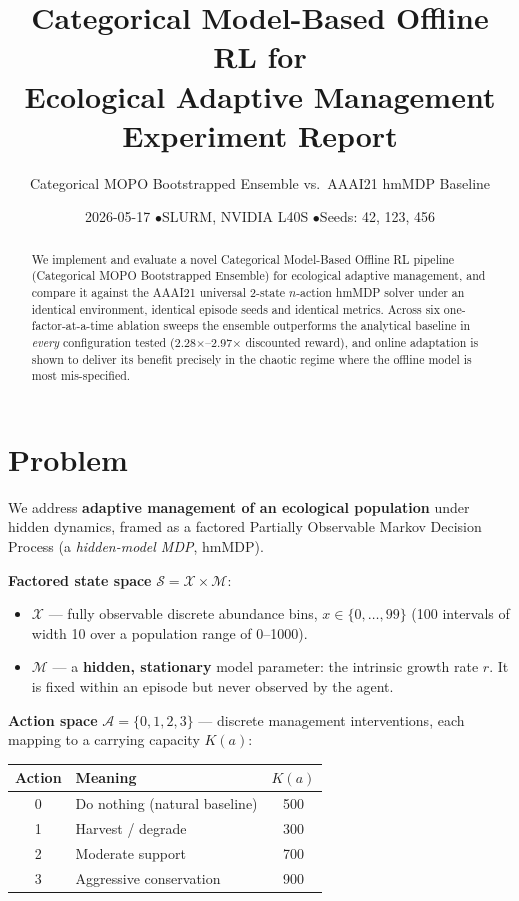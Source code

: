 \documentclass[11pt]{article}
\title{\textbf{Categorical Model-Based Offline RL for\\ Ecological Adaptive Management}\\[0.4em]
\large Experiment Report}
\author{Categorical MOPO Bootstrapped Ensemble vs.\ AAAI21 hmMDP Baseline}
\date{2026-05-17 \quad$\bullet$\quad SLURM, NVIDIA L40S \quad$\bullet$\quad Seeds: 42, 123, 456}
\begin{document}
\maketitle
\thispagestyle{empty}

\begin{abstract}
\noindent We implement and evaluate a novel Categorical Model-Based Offline RL
pipeline (Categorical MOPO Bootstrapped Ensemble) for ecological adaptive
management, and compare it against the AAAI21 universal 2-state $n$-action
hmMDP solver under an identical environment, identical episode seeds and
identical metrics. Across six one-factor-at-a-time ablation sweeps the
ensemble outperforms the analytical baseline in \emph{every} configuration
tested (2.28$\times$--2.97$\times$ discounted reward), and online adaptation
is shown to deliver its benefit precisely in the chaotic regime where the
offline model is most mis-specified.
\end{abstract}

\tableofcontents
\newpage

\section{Problem}

We address \textbf{adaptive management of an ecological population} under
hidden dynamics, framed as a factored Partially Observable Markov Decision
Process (a \emph{hidden-model MDP}, hmMDP).

\textbf{Factored state space} $\mathcal{S} = \mathcal{X} \times \mathcal{M}$:
\begin{itemize}
  \item $\mathcal{X}$ --- fully observable discrete abundance bins,
        $x \in \{0,\dots,99\}$ (100 intervals of width 10 over a
        population range of 0--1000).
  \item $\mathcal{M}$ --- a \textbf{hidden, stationary} model parameter:
        the intrinsic growth rate $r$. It is fixed within an episode but
        never observed by the agent.
\end{itemize}

\textbf{Action space} $\mathcal{A} = \{0,1,2,3\}$ --- discrete management
interventions, each mapping to a carrying capacity $K(a)$:

\begin{table}[H]
\centering
\begin{tabular}{clc}
\toprule
Action & Meaning & $K(a)$ \\
\midrule
0 & Do nothing (natural baseline) & 500 \\
1 & Harvest / degrade & 300 \\
2 & Moderate support & 700 \\
3 & Aggressive conservation & 900 \\
\bottomrule
\end{tabular}
\end{table}
\end{document}
